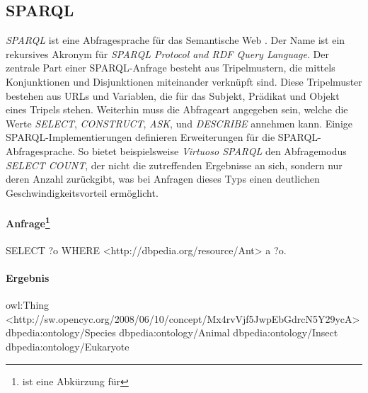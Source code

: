 \subsection{SPARQL}
\emph{SPARQL} ist eine Abfragesprache für das Semantische Web \citep[siehe][]{www-sparql}.
Der Name ist ein rekursives Akronym für \emph{SPARQL Protocol and RDF Query Language}.
Der zentrale Part einer SPARQL-Anfrage besteht aus Tripelmustern, die mittels Konjunktionen und Disjunktionen miteinander verknüpft sind.
Diese Tripelmuster bestehen aus URLs und Variablen, die für das Subjekt, Prädikat und Objekt eines Tripels stehen.
Weiterhin muss die Abfrageart angegeben sein, welche die Werte \emph{SELECT}, \emph{CONSTRUCT}, \emph{ASK}, und
\emph{DESCRIBE} annehmen kann.
Einige SPARQL-Implementierungen definieren Erweiterungen für die SPARQL-Abfragesprache.
So bietet beispielsweise \emph{Virtuoso SPARQL} den Abfragemodus \emph{SELECT COUNT}, der nicht die zutreffenden Ergebnisse an sich, sondern nur deren Anzahl zurückgibt, was bei Anfragen dieses Typs 
einen deutlichen Geschwindigkeitsvorteil ermöglicht.
\begin{bsp}
\paragraph[]{Anfrage\footnote{ ist eine Abkürzung für }}
\begin{verbatim*}
SELECT ?o WHERE
{
<http://dbpedia.org/resource/Ant> a ?o.
} 
\end{verbatim*}
\paragraph{Ergebnis}
\begin{verbatim*}
owl:Thing
<http://sw.opencyc.org/2008/06/10/concept/Mx4rvVjf5JwpEbGdrcN5Y29ycA>
dbpedia:ontology/Species
dbpedia:ontology/Animal
dbpedia:ontology/Insect
dbpedia:ontology/Eukaryote
\end{verbatim*}

\end{bsp}

